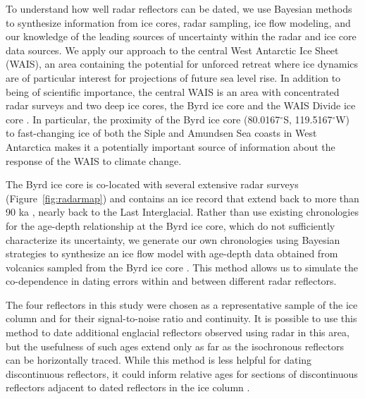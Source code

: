 To understand how well radar reflectors can be dated, we use Bayesian methods %
to synthesize information from ice cores, radar sampling, ice flow modeling, and our knowledge of the leading sources of uncertainty within the radar and ice core data sources. We apply our approach to the central West Antarctic Ice Sheet (WAIS), an area containing the potential for unforced retreat where ice dynamics are of particular interest for projections of future sea level rise. In addition to being of scientific importance, the central WAIS is an area with concentrated radar surveys and two deep ice cores, the Byrd ice core \citep{gow1968} and the WAIS Divide ice core \citep{buizert2015}. In particular, the proximity of the Byrd ice core (80.0167$^\circ$S, 119.5167$^\circ$W) to fast-changing ice of both the Siple and Amundsen Sea coasts in West Antarctica makes it a potentially important source of information about the response of the WAIS to climate change.

The Byrd ice core is co-located with several extensive radar surveys (Figure~\ref{fig:radarmap}) and contains an ice record that extend back to more than 90 ka \citep{blunier2001}, nearly back to the Last Interglacial. Rather than use existing chronologies for the age-depth relationship at the Byrd ice core, which do not sufficiently characterize its uncertainty, we generate our own chronologies using Bayesian strategies to synthesize an ice flow model with age-depth data obtained from volcanics sampled from the Byrd ice core \citep{gow1968,gow1970,hammer1997}. This method allows us to simulate the co-dependence in dating errors within and between different radar reflectors.

The four reflectors in this study were chosen as a representative sample of the ice column and for their signal-to-noise ratio and continuity. It is possible to use this method to date additional englacial reflectors observed using radar in this area, but the usefulness of such ages extend only as far as the isochronous reflectors can be horizontally traced. While this method is less helpful for dating discontinuous reflectors, it could inform relative ages for sections of discontinuous reflectors adjacent to dated reflectors in the ice column  \citep[e.g.][]{macgregor2015}.

